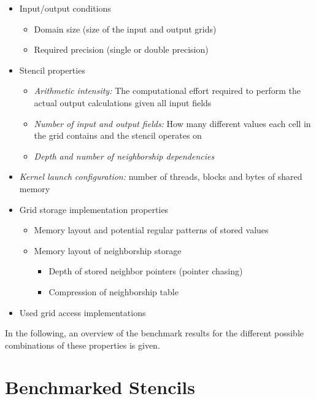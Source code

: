 \begin{itemize}
    \item 
        Input/output conditions 
        \begin{itemize}
            \item Domain size (size of the input and output grids)
            \item Required precision (single or double precision)
        \end{itemize}
    \item
        Stencil properties
        \begin{itemize}
            \item \emph{Arithmetic intensity:} The computational effort required to perform the actual output calculations given all input fields
            \item \emph{Number of input and output fields:} How many different values each cell in the grid contains and the stencil operates on
            \item \emph{Depth and number of neighborship dependencies}
        \end{itemize}
    \item
        \emph{Kernel launch configuration:} number of threads, blocks and bytes of shared memory
    \item
        Grid storage implementation properties
        \begin{itemize}
            \item Memory layout and potential regular patterns of stored values
            \item 
                Memory layout of neighborship storage
                \begin{itemize}
                    \item Depth of stored neighbor pointers (pointer chasing)
                    \item Compression of neighborship table
                \end{itemize}
        \end{itemize}
    \item
        Used grid access implementations
\end{itemize}

In the following, an overview of the benchmark results for the different possible combinations of these properties is given.

\section{Benchmarked Stencils}\label{sec:benchmark-setup}

